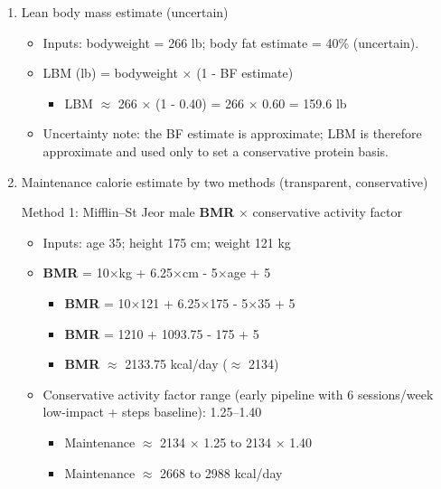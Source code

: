 \documentclass[10pt]{article}
\begin{document}
\begin{enumerate}
\item Lean body mass estimate (uncertain)

\begin{itemize}
\item Inputs: bodyweight = 266 lb; body fat estimate = 40\% (uncertain).
\item LBM (lb) = bodyweight \ensuremath{\times} (1 - BF estimate)
  \begin{itemize}
  \item LBM $\approx$ 266 \ensuremath{\times} (1 - 0.40) = 266 \ensuremath{\times} 0.60 = 159.6 lb
  \end{itemize}
\item Uncertainty note: the BF estimate is approximate; LBM is therefore approximate and used only to set a conservative protein basis.
\end{itemize}

\item Maintenance calorie estimate by two methods (transparent, conservative)

Method 1: Mifflin–St Jeor male \textbf{BMR} \ensuremath{\times} conservative activity factor

\begin{itemize}
\item Inputs: age 35; height 175 cm; weight 121 kg
\item \textbf{BMR} = 10\ensuremath{\times}kg + 6.25\ensuremath{\times}cm - 5\ensuremath{\times}age + 5
  \begin{itemize}
  \item \textbf{BMR} = 10\ensuremath{\times}121 + 6.25\ensuremath{\times}175 - 5\ensuremath{\times}35 + 5
  \item \textbf{BMR} = 1210 + 1093.75 - 175 + 5
  \item \textbf{BMR} $\approx$ 2133.75 kcal/day ($\approx$ 2134)
  \end{itemize}
\item Conservative activity factor range (early pipeline with 6 sessions/week low-impact + steps baseline): 1.25–1.40
  \begin{itemize}
  \item Maintenance $\approx$ 2134 \ensuremath{\times} 1.25 to 2134 \ensuremath{\times} 1.40
  \item Maintenance $\approx$ 2668 to 2988 kcal/day
  \end{itemize}
\end{itemize}


\end{enumerate}
\end{document}
